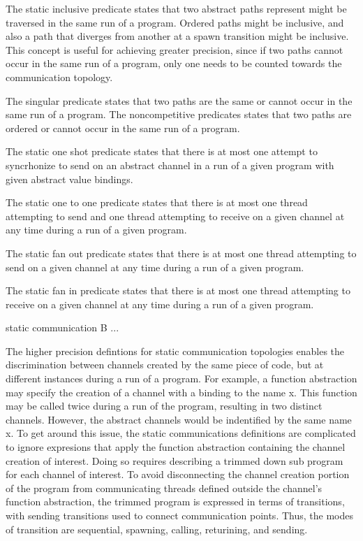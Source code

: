 \documentclass{article}
\begin{document}
The static inclusive predicate states that two abstract paths represent might be traversed in the same run of a program.   Ordered paths might be inclusive, and also a path that diverges from another at a spawn transition might be inclusive.  This concept is useful for achieving greater precision, since if two paths cannot occur in the same run of a program, only one needs to be counted towards the communication topology. 

The singular predicate states that two paths are the same or cannot occur in the same run of a program.    
The noncompetitive predicates states that two paths are ordered or cannot occur in the same run of a program.

The static one shot predicate states that there is at most one attempt to syncrhonize to send on an abstract channel in a run of a given program with given abstract value bindings.

The static one to one predicate states that there is at most one thread attempting to send and one thread attempting to receive on a given channel at any time during a run of a given program.

The static fan out predicate states that there is at most one thread attempting to send on a given channel at any time during a run of a given program.

The static fan in predicate states that there is at most one thread attempting to receive on a given channel at any time during a run of a given program.


static communication B ...

The higher precision defintions for static communication topologies enables the discrimination between channels created by the same piece of code, but at different instances during a run of a program.  For example, a function abstraction may specify the creation of a channel with a binding to the name x.  This function may be called twice during a run of the program, resulting in two distinct channels.  However, the abstract channels would be indentified by the same name x.  To get around this issue, the static communications definitions are complicated to ignore expresions that apply the function abstraction containing the channel creation of interest.  Doing so requires describing a trimmed down sub program for each channel of interest.  To avoid disconnecting the channel creation portion of the program from communicating threads defined outside the channel's function abstraction, the trimmed program is expressed in terms of transitions, with sending transitions used to connect communication points.  
Thus, the modes of transition are sequential, spawning, calling, returining, and sending. 
\end{document}
